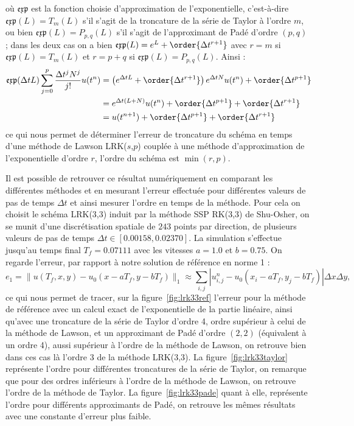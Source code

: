 où $\mathfrak{exp}$ est la fonction choisie d'approximation de l'exponentielle, c'est-à-dire $\mathfrak{exp}(L) = T_m(L)$ s'il s'agit de la troncature de la série de Taylor à l'ordre $m$, ou bien $\mathfrak{exp}(L) = P_{p,q}(L)$ s'il s'agit de l'approximant de Padé d'ordre $(p,q)$ ; dans les deux cas on a bien $\mathfrak{exp}(L) = e^{L} + \order{\Delta t^{r+1}}$ avec $r = m$ si $\mathfrak{exp}(L) = T_m(L)$ et $r = p+q$ si $\mathfrak{exp}(L) = P_{p,q}(L)$. Ainsi :
$$
  \begin{aligned}
    \mathfrak{exp}(\Delta tL)\sum_{j=0}^{p}\frac{\Delta t^jN^j}{j!}u(t^n) &= \left(e^{\Delta t L} + \order{\Delta t^{r+1}}\right)e^{\Delta t N}u(t^n) + \order{\Delta t^{p+1}} \\
      &= e^{\Delta t(L+N)}u(t^n) + \order{\Delta t^{p+1}} + \order{\Delta t^{r+1}} \\
      &= u(t^{n+1}) + \order{\Delta t^{p+1}} + \order{\Delta t^{r+1}}
  \end{aligned}
$$
ce qui nous permet de déterminer l'erreur de troncature du schéma en temps d'une méthode de Lawson LRK($s$,$p$) couplée à une méthode d'approximation de l'exponentielle d'ordre $r$, l'ordre du schéma est $\min(r,p)$.

Il est possible de retrouver ce résultat numériquement en comparant les différentes méthodes et en mesurant l'erreur effectuée pour différentes valeurs de pas de temps $\Delta t$ et ainsi mesurer l'ordre en temps de la méthode. Pour cela on choisit le schéma LRK(3,3) induit par la méthode SSP RK(3,3) de Shu-Osher, on se munit d'une discrétisation spatiale de $243$ points par direction, de plusieurs valeurs de pas de temps $\Delta t\in[0.00158,0.02370]$. La simulation s'effectue jusqu'au temps final $T_f=0.07111$ avec les vitesses $a=1.0$ et $b=0.75$. On regarde l'erreur, par rapport à notre solution de référence en norme 1 :
$$
  e_1 = \| u(T_f,x,y) - u_0(x-aT_f,y-bT_f) \|_1 \approx \sum_{i,j}|u^n_{i,j}-u_0(x_i-aT_f,y_j-bT_f)|\Delta x\Delta y,
$$
ce qui nous permet de tracer, sur la figure~\ref{fig:lrk33ref} l'erreur pour la méthode de référence avec un calcul exact de l'exponentielle de la partie linéaire, ainsi qu'avec une troncature de la série de Taylor d'ordre 4, ordre supérieur à celui de la méthode de Lawson, et un approximant de Padé d'ordre $(2,2)$ (équivalent à un ordre 4), aussi supérieur à l'ordre de la méthode de Lawson, on retrouve bien dans ces cas là l'ordre 3 de la méthode LRK(3,3). La figure~\ref{fig:lrk33taylor} représente l'ordre pour différentes troncatures de la série de Taylor, on remarque que pour des ordres inférieurs à l'ordre de la méthode de Lawson, on retrouve l'ordre de la méthode de Taylor. La figure~\ref{fig:lrk33pade} quant à elle, représente l'ordre pour différents approximants de Padé, on retrouve les mêmes résultats avec une constante d'erreur plus faible.

